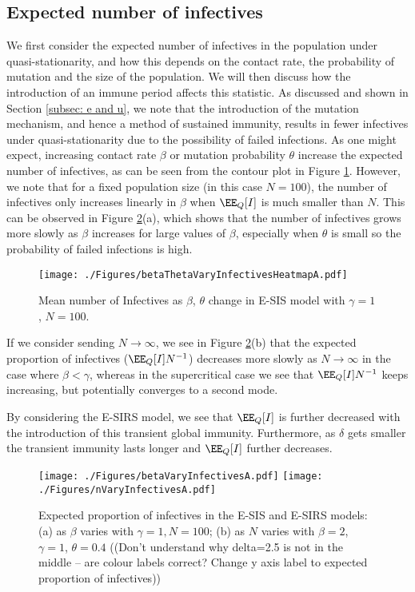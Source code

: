 \documentclass[smallextended]{svjour3}       %
\begin{document}
\subsection{Expected number of infectives}
We first consider the expected number of infectives in the population under quasi-stationarity, and how this depends on the contact rate, the probability of mutation and the size of the population. We will then discuss how the introduction of an immune period affects this statistic. As discussed and shown in Section \ref{subsec: e and u}, we note that the introduction of the mutation mechanism, and hence a method of sustained immunity, results in fewer infectives under quasi-stationarity due to the possibility of failed infections.
As one might expect, increasing contact rate $\beta$ or mutation probability $\theta$ increase the expected number of infectives, as can be seen from the contour plot in Figure \ref{fig: bt sis}. However, we note that for a fixed population size (in this case $N=100$), the number of infectives only increases linearly in $\beta$ when $\EE_Q[I]$ is much smaller than $N$. This can be observed in Figure \ref{fig: b sis}(a), which shows that the number of infectives grows more slowly as $\beta$ increases for large values of $\beta$, especially when $\theta$ is small so the probability of failed infections is high. 

\begin{figure}
	\centering
	\texttt{[image: ./Figures/betaThetaVaryInfectivesHeatmapA.pdf]}
	\caption[Infectives as $\beta, \theta$ Vary in the E-SIS Model.]{Mean number of Infectives as $\beta$, $\theta$ change in E-SIS model with $\gamma = 1$, $N=100$.
}
	\label{fig: bt sis}
\end{figure}

If we consider sending $N \rightarrow \infty$, we see in Figure \ref{fig: b sis}(b) that the expected proportion of infectives ($\EE_Q[I] N^{-1}$) decreases more slowly as $N \rightarrow \infty$ in the case where $\beta < \gamma$, whereas in the supercritical case we see that $\EE_Q[I] N^{-1}$ keeps increasing, but potentially converges to a second mode.

By considering the E-SIRS model, we see that $\EE_Q[I]$ is further decreased with the introduction of this transient global immunity. Furthermore, as $\delta$ gets smaller the transient immunity lasts longer and $\EE_Q[I]$ further decreases. 

\begin{figure}
	\centering
 		\texttt{[image: ./Figures/betaVaryInfectivesA.pdf]}
 		\texttt{[image: ./Figures/nVaryInfectivesA.pdf]}
	\caption{Expected proportion of infectives in the E-SIS and E-SIRS models: (a) as $\beta$ varies with $\gamma=1, N=100$; (b) as $N$ varies with $\beta = 2$, $\gamma = 1$, $\theta=0.4$
	((Don't understand why delta=2.5 is not in the middle -- are colour labels correct? Change y axis label to expected proportion of infectives))}
	\label{fig: b sis}
\end{figure}
\end{document}
